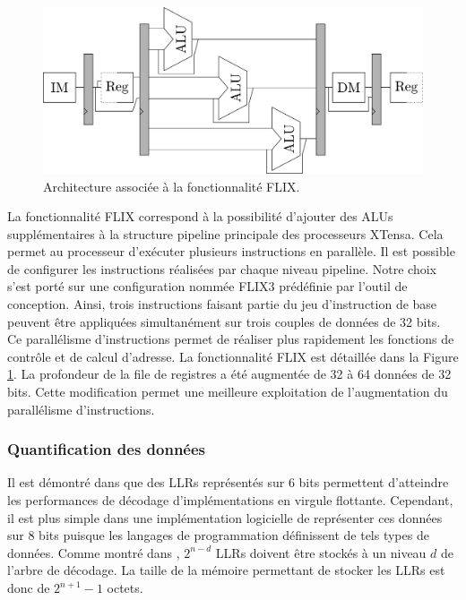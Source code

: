 \begin{figure}
\centering
\includegraphics[width=\textwidth]{main/ch3_fig/flix}
\caption{Architecture associée à la fonctionnalité FLIX.}
\label{fig:flix}
\end{figure}

La fonctionnalité FLIX correspond à la possibilité d'ajouter des ALUs supplémentaires à la structure pipeline principale des processeurs XTensa. Cela permet au processeur d'exécuter plusieurs instructions en parallèle. Il est possible de configurer les instructions réalisées par chaque niveau pipeline. Notre choix s'est porté sur une configuration nommée FLIX3 prédéfinie par l'outil de conception. Ainsi, trois instructions faisant partie du jeu d'instruction de base peuvent être appliquées simultanément sur trois couples de données de 32 bits. Ce parallélisme d'instructions permet de réaliser plus rapidement les fonctions de contrôle et de calcul d'adresse. La fonctionnalité FLIX est détaillée dans la Figure \ref{fig:flix}.
La profondeur de la file de registres a été augmentée de 32 à 64 données de 32 bits. Cette modification permet une meilleure exploitation de l'augmentation du parallélisme d'instructions.

\subsubsection{Quantification des données}
Il est démontré dans \cite{sarkis_fast_2014} que des LLRs représentés sur 6 bits permettent d'atteindre les performances de décodage d'implémentations en virgule flottante. Cependant, il est plus simple dans une implémentation logicielle de représenter ces données sur 8 bits puisque les langages de programmation définissent de tels types de données. Comme montré dans \cite{leroux_hardware_2011}, $2^{n-d}$ LLRs doivent être stockés à un niveau $d$ de l'arbre de décodage. La taille de la mémoire permettant de stocker les LLRs est donc de $2^{n+1}-1$ octets.

